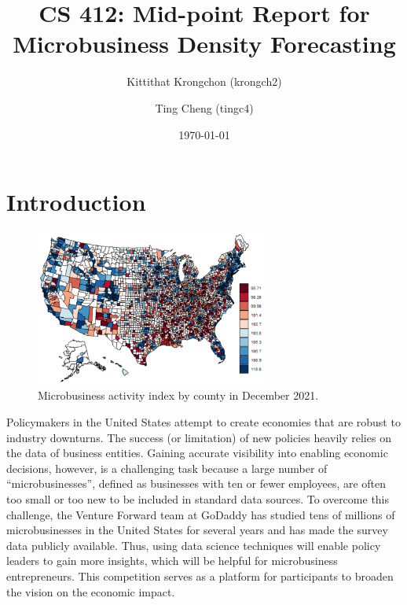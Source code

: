 \documentclass[prl,aps,superscriptaddress,twocolumn,10pt,nolongbibliography]{revtex4-2}
\begin{document}
\title{CS 412: Mid-point Report for Microbusiness Density Forecasting}
\author{Kittithat Krongchon (krongch2)}
\author{Ting Cheng (tingc4)}
\date{\today}

\maketitle

\section{Introduction}
\begin{figure}
\includegraphics[width=3in]{figs/activity.png}
\caption{\label{fig:activity}
Microbusiness activity index by county in December 2021.
}
\end{figure}

Policymakers in the United States attempt to create economies that are robust to industry downturns. 
The success (or limitation) of new policies heavily relies on the data of business entities. 
Gaining accurate visibility into enabling economic decisions, however, is a challenging task because a large number of ``microbusinesses'', defined as businesses with ten or fewer employees, are often too small or too new to be included in standard data sources.
To overcome this challenge, the Venture Forward team at GoDaddy has studied tens of millions of microbusinesses in the United States for several years and has made the survey data publicly available. 
Thus, using data science techniques will enable policy leaders to gain more insights, which will be helpful for microbusiness entrepreneurs. 
This competition serves as a platform for participants to broaden the vision on the economic impact. 
\end{document}
